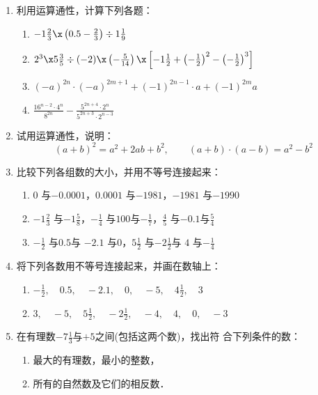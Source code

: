 \begin{enumerate}
	\item 利用运算通性，计算下列各题：
	\begin{enumerate}
		\item $-1\frac{2}{3}\x \left(0.5-\frac{2}{3}\right)\div 1\frac{1}{9}$
		\item $2^3\x 5\frac{3}{5}\div (-2)\x\left(-\frac{5}{14}\right)\x \left[-1\frac{1}{2}+\left(-\frac{1}{2}\right)^2-\left(-\frac{1}{2}\right)^3\right]$
		\item $(-a)^{2n}\cdot (-a)^{2m+1}+(-1)^{2n-1}\cdot a+(-1)^{2m}a$
		\item $\frac{16^{n-2}\cdot 4^n}{8^{2n}}-\frac{5^{2n+4}\cdot 2^n}{5^{2n+3}\cdot 2^{n-3}}$
	\end{enumerate}
	
	\item 试用运算通性，说明：
	\[(a+b)^2=a^2+2ab+b^2,\qquad (a+b)\cdot (a-b)=a^2-b^2 \]
	\item 比较下列各组数的大小，并用不等号连接起来：
	\begin{enumerate}
		\item $0$ 与$-0.0001$，\quad $0.0001$ 与$-1981$，\quad $-1981$ 与$-1990$ 
		\item $-1\frac{2}{3}$ 与$-1\frac{5}{8}$，\quad $-\frac{1}{4}$ 与$100$与$-\frac{1}{7}$，\quad $\frac{4}{5}$ 与$-0.1$与$\frac{5}{4}$
		\item  $-\frac{1}{2}$ 与$0.5$与 $-2.1$ 与$0$，\quad $5\frac{1}{2}$ 与$-2\frac{1}{2}$与 $4$ 与$-\frac{1}{4}$ 
	\end{enumerate}
	
	\item 将下列各数用不等号连接起来，并画在数轴上：
	\begin{enumerate}
		\item $-\frac{1}{2},\quad  0.5 ,\quad -2.1  ,\quad 0  ,\quad -5  ,\quad  4\frac{1}{2} ,\quad 3  $
		\item $3,\quad  -5 ,\quad 5\frac{1}{2}  ,\quad  -2\frac{1}{2} ,\quad  -4 ,\quad  4 ,\quad  0 ,\quad  -3 $
	\end{enumerate}
	
	\item  在有理数$-7\frac{1}{3}$与$+5$之间(包括这两个数)，找出符
	合下列条件的数：
	\begin{enumerate}
		\item 最大的有理数，最小的整数，
		\item 所有的自然数及它们的相反数．
	\end{enumerate}
	

\end{enumerate}
